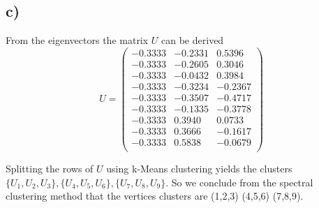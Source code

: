 \subsection*{c)}
From the eigenvectors the matrix $U$ can be derived\[U=\left(\begin{matrix}
-0.3333&  -0.2331&0.5396\\
-0.3333&	-0.2605&	0.3046\\
-0.3333&	-0.0432&	0.3984\\
-0.3333&	-0.3234&	-0.2367\\
-0.3333&	-0.3507&	-0.4717\\
-0.3333&	-0.1335&	-0.3778\\
-0.3333&	0.3940&	0.0733\\
-0.3333&	0.3666&	-0.1617\\
-0.3333&	0.5838&	-0.0679\\
\end{matrix}\right)\]

Splitting the rows of $U$ using k-Means clustering yields the clusters\\ $\lbrace U_1,U_2,U_3\rbrace,\lbrace U_4,U_5,U_6\rbrace,\lbrace U_7,U_8,U_9\rbrace$. So we conclude from the spectral clustering method that the vertices clusters are (1,2,3) (4,5,6) (7,8,9).